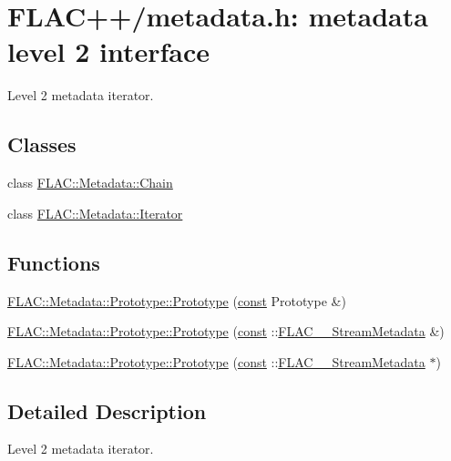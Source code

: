 \hypertarget{group__flacpp__metadata__level2}{}\section{F\+L\+A\+C++/metadata.h\+: metadata level 2 interface}
\label{group__flacpp__metadata__level2}


Level 2 metadata iterator.  


\subsection*{Classes}
\begin{DoxyCompactItemize}
\item 
class \hyperlink{class_f_l_a_c_1_1_metadata_1_1_chain}{F\+L\+A\+C\+::\+Metadata\+::\+Chain}
\item 
class \hyperlink{class_f_l_a_c_1_1_metadata_1_1_iterator}{F\+L\+A\+C\+::\+Metadata\+::\+Iterator}
\end{DoxyCompactItemize}
\subsection*{Functions}
\begin{DoxyCompactItemize}
\item 
\hyperlink{group__flacpp__metadata__level2_gae49fa399a6273ccad7cb0e6f787a3f5c}{F\+L\+A\+C\+::\+Metadata\+::\+Prototype\+::\+Prototype} (\hyperlink{getopt1_8c_a2c212835823e3c54a8ab6d95c652660e}{const} Prototype \&)
\item 
\hyperlink{group__flacpp__metadata__level2_ga3d03bfec2cd09578f166fcd463b56d4f}{F\+L\+A\+C\+::\+Metadata\+::\+Prototype\+::\+Prototype} (\hyperlink{getopt1_8c_a2c212835823e3c54a8ab6d95c652660e}{const} \+::\hyperlink{struct_f_l_a_c_____stream_metadata}{F\+L\+A\+C\+\_\+\+\_\+\+Stream\+Metadata} \&)
\item 
\hyperlink{group__flacpp__metadata__level2_ga1b39c0561f84c3529302dc68b1ba8a2e}{F\+L\+A\+C\+::\+Metadata\+::\+Prototype\+::\+Prototype} (\hyperlink{getopt1_8c_a2c212835823e3c54a8ab6d95c652660e}{const} \+::\hyperlink{struct_f_l_a_c_____stream_metadata}{F\+L\+A\+C\+\_\+\+\_\+\+Stream\+Metadata} $\ast$)
\end{DoxyCompactItemize}


\subsection{Detailed Description}
Level 2 metadata iterator. 

